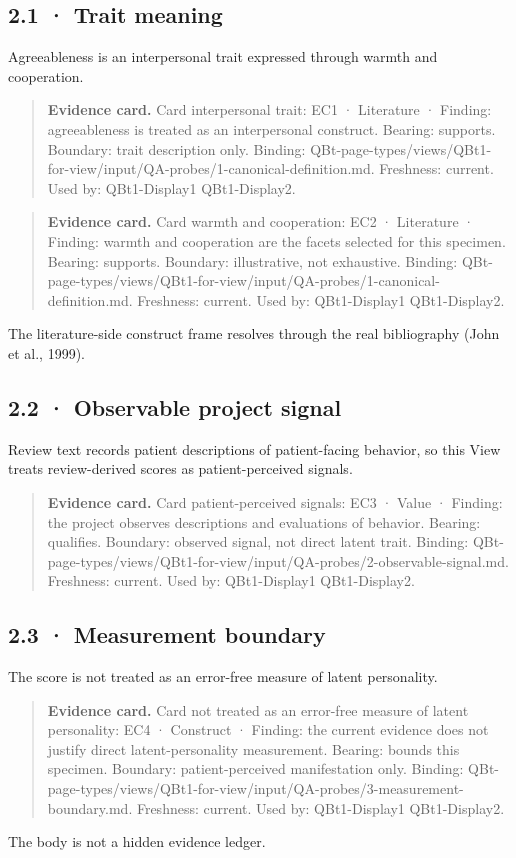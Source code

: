 \documentclass[11pt]{article}
\begin{document}
\subsection*{2.1 · Trait meaning}
Agreeableness is an interpersonal trait expressed through warmth and cooperation.

\begin{quote}\footnotesize\textbf{Evidence card.} Card interpersonal trait: EC1 · Literature · Finding: agreeableness is treated as an interpersonal construct. Bearing: supports. Boundary: trait description only. Binding: QBt-page-types/views/QBt1-for-view/input/QA-probes/1-canonical-definition.md. Freshness: current. Used by: QBt1-Display1 QBt1-Display2.\end{quote}
\begin{quote}\footnotesize\textbf{Evidence card.} Card warmth and cooperation: EC2 · Literature · Finding: warmth and cooperation are the facets selected for this specimen. Bearing: supports. Boundary: illustrative, not exhaustive. Binding: QBt-page-types/views/QBt1-for-view/input/QA-probes/1-canonical-definition.md. Freshness: current. Used by: QBt1-Display1 QBt1-Display2.\end{quote}
The literature-side construct frame resolves through the real bibliography (John et al., 1999).

\subsection*{2.2 · Observable project signal}
Review text records patient descriptions of patient-facing behavior, so this View treats review-derived scores as patient-perceived signals.

\begin{quote}\footnotesize\textbf{Evidence card.} Card patient-perceived signals: EC3 · Value · Finding: the project observes descriptions and evaluations of behavior. Bearing: qualifies. Boundary: observed signal, not direct latent trait. Binding: QBt-page-types/views/QBt1-for-view/input/QA-probes/2-observable-signal.md. Freshness: current. Used by: QBt1-Display1 QBt1-Display2.\end{quote}
\subsection*{2.3 · Measurement boundary}
The score is not treated as an error-free measure of latent personality.

\begin{quote}\footnotesize\textbf{Evidence card.} Card not treated as an error-free measure of latent personality: EC4 · Construct · Finding: the current evidence does not justify direct latent-personality measurement. Bearing: bounds this specimen. Boundary: patient-perceived manifestation only. Binding: QBt-page-types/views/QBt1-for-view/input/QA-probes/3-measurement-boundary.md. Freshness: current. Used by: QBt1-Display1 QBt1-Display2.\end{quote}
The body is not a hidden evidence ledger.
\end{document}
